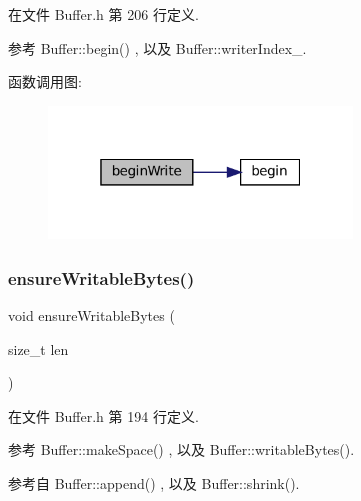 在文件 Buffer.\+h 第 206 行定义.



参考 Buffer\+::begin() , 以及 Buffer\+::writer\+Index\+\_\+.

函数调用图\+:
\nopagebreak
\begin{figure}[H]
\begin{center}
\leavevmode
\includegraphics[width=229pt]{classmuduo_1_1net_1_1Buffer_a46f79eca290d4d4cee634e3c1b50c57d_cgraph}
\end{center}
\end{figure}
\mbox{\label{classmuduo_1_1net_1_1Buffer_a1185aa5bbe069f50c8d46a9f8d5aac32}} 
\subsubsection{\texorpdfstring{ensure\+Writable\+Bytes()}{ensureWritableBytes()}}
{\footnotesize\ttfamily void ensure\+Writable\+Bytes (\begin{DoxyParamCaption}\item[{size\+\_\+t}]{len }\end{DoxyParamCaption})\hspace{0.3cm}{\ttfamily [inline]}}



在文件 Buffer.\+h 第 194 行定义.



参考 Buffer\+::make\+Space() , 以及 Buffer\+::writable\+Bytes().



参考自 Buffer\+::append() , 以及 Buffer\+::shrink().

